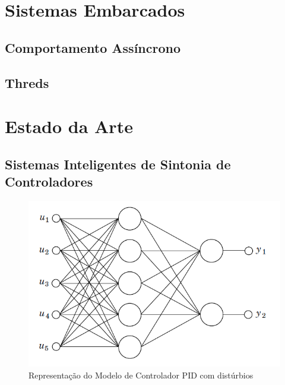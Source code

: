 \section{Sistemas Embarcados}

\subsection{Comportamento Assíncrono}

\subsection{Threds}

\section{Estado da Arte}

\subsection{Sistemas Inteligentes de Sintonia de Controladores}

\begin{figure}[htb]
  \caption{Representação do Modelo de Controlador PID com distúrbios}
  \begin{center}
      \includegraphics[scale=0.65]{img/feedforward_neural_astrom_p297}
  \end{center}
\end{figure}


